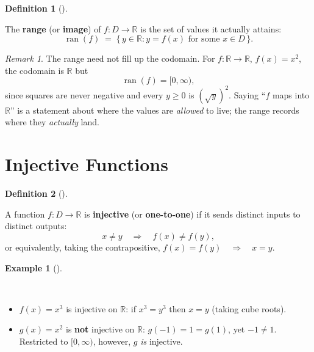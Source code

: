 \documentclass[
  letterpaper,
  DIV=11,
  numbers=noendperiod]{scrreprt}
\providecommand{\tightlist}{%
  \setlength{\itemsep}{0pt}\setlength{\parskip}{0pt}}
\theoremstyle{plain}
\theoremstyle{plain}
\theoremstyle{definition}
\newtheorem{definition}{Definition}[chapter]
\theoremstyle{definition}
\theoremstyle{definition}
\newtheorem{example}{Example}[chapter]
\theoremstyle{plain}
\theoremstyle{plain}
\theoremstyle{remark}
\newtheorem{refremark}{Remark}[chapter]
\begin{document}
\begin{definition}[]\protect\hypertarget{def-range}{}\label{def-range}

\hfill\break
The \textbf{range} (or \textbf{image}) of \(f\colon D\to\mathbb{R}\) is
the set of values it actually attains: \[
\operatorname{ran}(f) \;=\; \{\, y\in\mathbb{R}: y = f(x) \text{ for some } x\in D \,\}.
\]

\end{definition}

\begin{refremark}
The range need not fill up the codomain. For
\(f\colon\mathbb{R}\to\mathbb{R}\), \(f(x)=x^2\), the codomain is
\(\mathbb{R}\) but \[
\operatorname{ran}(f) = [0,\infty),
\] since squares are never negative and every \(y\ge 0\) is
\((\sqrt y)^2\). Saying ``\(f\) maps into \(\mathbb{R}\)'' is a
statement about where the values are \emph{allowed} to live; the range
records where they \emph{actually} land.

\label{rem-range-vs-codomain}

\end{refremark}

\section{Injective Functions}\label{injective-functions}

\begin{definition}[]\protect\hypertarget{def-injection}{}\label{def-injection}

\hfill\break
A function \(f\colon D\to\mathbb{R}\) is \textbf{injective} (or
\textbf{one-to-one}) if it sends distinct inputs to distinct outputs: \[
x\neq y \quad \Rightarrow \quad f(x)\neq f(y),
\] or equivalently, taking the contrapositive,
\(f(x)=f(y) \quad \Rightarrow \quad x=y\).

\end{definition}

\begin{example}[]\protect\hypertarget{exm-injection}{}\label{exm-injection}

~

\begin{itemize}
\tightlist
\item
  \(f(x)=x^3\) is injective on \(\mathbb{R}\): if \(x^3 = y^3\) then
  \(x=y\) (taking cube roots).
\item
  \(g(x)=x^2\) is \textbf{not} injective on \(\mathbb{R}\):
  \(g(-1) = 1 = g(1)\), yet \(-1\neq 1\). Restricted to \([0,\infty)\),
  however, \(g\) \emph{is} injective.
\end{itemize}

\end{example}
\end{document}
